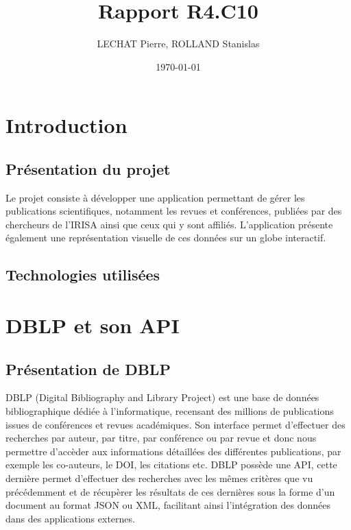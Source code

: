 \documentclass[a4paper,12pt]{article}
\title{Rapport R4.C10} %
\author{LECHAT Pierre, ROLLAND Stanislas}
\date{\today}
\begin{document}
\maketitle  
\tableofcontents  
\newpage          


\section{Introduction}

\subsection{Présentation du projet}
Le projet consiste à développer une application permettant de gérer les publications scientifiques, notamment les revues et conférences, publiées par des chercheurs de l'IRISA ainsi que ceux qui y sont affiliés. L'application présente 
également une représentation visuelle de ces données sur un globe interactif.

\subsection{Technologies utilisées}


\section{DBLP et son API}

\subsection{Présentation de DBLP}
DBLP (Digital Bibliography and Library Project) est une base de données bibliographique dédiée à l’informatique, recensant des millions de publications issues de conférences et revues académiques. 
Son interface permet d’effectuer des recherches par auteur, par titre, par conférence ou par revue et donc nous permettre d'accèder aux informations détaillées des différentes publications, par exemple les co-auteurs, le DOI, 
les citations etc. DBLP possède une API, cette dernière permet d'effectuer des recherches avec les mêmes critères que vu précédemment et de récupèrer les résultats de ces dernières sous la forme d'un document au format JSON ou XML,
facilitant ainsi l'intégration des données dans des applications externes.
\end{document}
